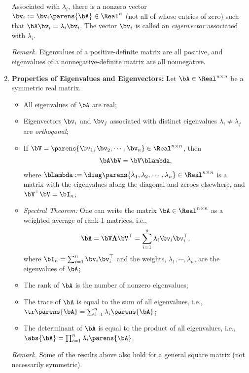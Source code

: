 \documentclass[12pt]{article}
\begin{document}
\begin{enumerate}[label=\textbf{\arabic*.}]
	Associated with $\lambda_i$, there is a nonzero vector $\bv_i := \bv_i \parens{\bA} \in \Real^n$ (not all of whose entries of zero) such that $ \bA \bv_i = \lambda_i \bv_i$. The vector $\bv_i$ is called an \textit{eigenvector} associated with $\lambda_i$. 
	
	\textit{Remark.} Eigenvalues of a positive-definite matrix are all positive, and eigenvalues of a nonnegative-definite matrix are all nonnegative. 
	
	\item \textbf{Properties of Eigenvalues and Eigenvectors:} Let $\bA \in \Real^{n \times n}$ be a symmetric real matrix. 
	\begin{itemize}
		\item All eigenvalues of $\bA$ are real; 
		\item Eigenvectors $\bv_i$ and $\bv_j$ associated with distinct eigenvalues $\lambda_i \ne \lambda_j$ are \textit{orthogonal}; 
		\item If $ \bV = \parens{\bv_1, \bv_2, \cdots, \bv_n} \in \Real^{n \times n}$, then 
		\begin{align*}
			\bA \bV = \bV \bLambda, 
		\end{align*}
		where $ \bLambda := \diag \parens{ \lambda_1, \lambda_2, \cdots, \lambda_n} \in \Real^{n \times n}$ is a matrix with the eigenvalues along the diagonal and zeroes elsewhere, and $\bV^\top \bV = \bI_n$; 
		
		\item \textit{Spectral Theorem:} One can write the matrix $\bA \in \Real^{n \times n}$ as a weighted average of rank-1 matrices, i.e., 
		\begin{align*}
			\bA = \bV \boldsymbol{\Lambda} \bV^\top = \sum_{i=1}^n \lambda_i \bv_i \bv_i^\top, 
		\end{align*}
		where $\bI_n = \sum_{i=1}^n \bv_i \bv_i^\top$ and the weights, $ \lambda_1, \cdots, \lambda_n$, are the eigenvalues of $\bA$; 
		\item The rank of $\bA$ is the number of nonzero eigenvalues; 
		\item The trace of $\bA$ is equal to the sum of all eigenvalues, i.e., $\tr \parens{\bA} = \sum_{i=1}^n \lambda_i \parens{\bA}$; 
		\item The determinant of $\bA$ is equal to the product of all eigenvalues, i.e., $\abs{\bA} = \prod_{i=1}^n \lambda_i \parens{\bA}$. 
	\end{itemize}
	
	\textit{Remark.} Some of the results above also hold for a general square matrix (not necessarily symmetric). 
	

\end{enumerate}
\end{document}
